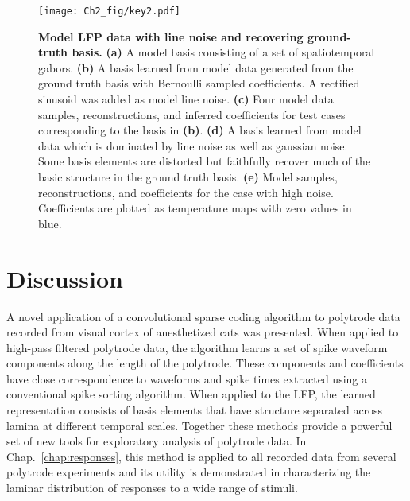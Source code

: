 \begin{figure}[htp!]
  \centering
  \texttt{[image: Ch2\_fig/key2.pdf]}
  \caption{\textbf{Model LFP data with line noise and recovering
      ground-truth basis.}  \textbf{(a)} A model basis consisting of a
    set of spatiotemporal gabors. \textbf{(b)} A basis learned from
    model data generated from the ground truth basis with Bernoulli
    sampled coefficients. A rectified sinusoid was added as model line
    noise. \textbf{(c)} Four model data samples, reconstructions, and
    inferred coefficients for test cases corresponding to the basis in
    \textbf{(b)}. \textbf{(d)} A basis learned from model data which
    is dominated by line noise as well as gaussian noise. Some basis
    elements are distorted but faithfully recover much of the basic
    structure in the ground truth basis. \textbf{(e)} Model samples,
    reconstructions, and coefficients for the case with high
    noise. Coefficients are plotted as temperature maps with zero
    values in blue.}
  \label{fig:modellfp}
\end{figure}
\clearpage

\section{Discussion}

A novel application of a convolutional sparse coding algorithm to
polytrode data recorded from visual cortex of anesthetized cats was
presented. When applied to high-pass filtered polytrode data, the
algorithm learns a set of spike waveform components along the length
of the polytrode. These components and coefficients have close
correspondence to waveforms and spike times extracted using a
conventional spike sorting algorithm. When applied to the LFP, the
learned representation consists of basis elements that have structure
separated across lamina at different temporal scales. Together these
methods provide a powerful set of new tools for exploratory analysis
of polytrode data. In Chap.~\ref{chap:responses}, this method is
applied to all recorded data from several polytrode experiments and
its utility is demonstrated in characterizing the laminar distribution
of responses to a wide range of stimuli.

